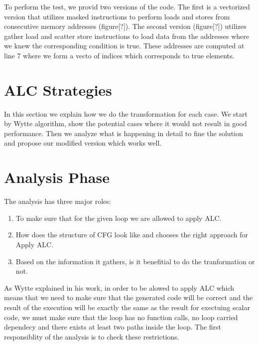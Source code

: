 \documentclass[\main/thesis.tex]{subfiles}
\begin{document}
To perform the test, we provid two versions of the code. The first is a vectorized version that utilizes masked instructions to perform loads and stores from consecutive memory addresses (figure[?]). The second version (figure[?]) utilizes gather load and scatter store instructions to load data from the addresses where we knew the corresponding condition is true. These addresses are computed at line 7 where we form a vecto of indices which corresponds to true elements.




\section{ALC Strategies}

In this section we explain how we do the transformation for each case. We start by Wytte algorithm, show the potential cases where it would not result in good performance. Then we analyze what is happening in detail to fine the solution and propose our modified version which works well.






\section{Analysis Phase}

The analysis has three major roles:
\begin{enumerate}
    \item To make sure that for the given loop we are allowed to apply ALC.
    \item How does the structure of CFG look like and chooses the right approach for Apply ALC.
    \item Based on the information it gathers, is it benefitial to do the tranformation or not.
\end{enumerate}

As Wytte explained in his work, in order to be alowed to apply ALC which means that we need to make sure that the generated code will be correct and the result of the execution will be exactly the same as the result for exectuing scalar code, we must make sure that the loop has no function calls, no loop carried dependecy and there exists at least two paths inside the loop. The first responsiblity of the analysis is to check these restrictions.
\end{document}
